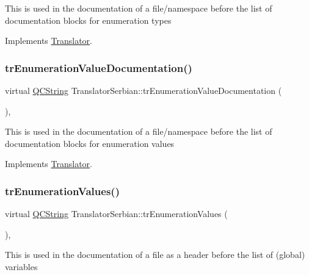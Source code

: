 This is used in the documentation of a file/namespace before the list of documentation blocks for enumeration types 

Implements \mbox{\hyperlink{class_translator}{Translator}}.

\mbox{\label{class_translator_serbian_ad10b2bac4e51aca8985c2b255fbd911f}} 
\subsubsection{\texorpdfstring{trEnumerationValueDocumentation()}{trEnumerationValueDocumentation()}}
{\footnotesize\ttfamily virtual \mbox{\hyperlink{class_q_c_string}{Q\+C\+String}} Translator\+Serbian\+::tr\+Enumeration\+Value\+Documentation (\begin{DoxyParamCaption}{ }\end{DoxyParamCaption})\hspace{0.3cm}{\ttfamily [inline]}, {\ttfamily [virtual]}}

This is used in the documentation of a file/namespace before the list of documentation blocks for enumeration values 

Implements \mbox{\hyperlink{class_translator}{Translator}}.

\mbox{\label{class_translator_serbian_a2f2df06b1746143ec0f381b9ae735c93}} 
\subsubsection{\texorpdfstring{trEnumerationValues()}{trEnumerationValues()}}
{\footnotesize\ttfamily virtual \mbox{\hyperlink{class_q_c_string}{Q\+C\+String}} Translator\+Serbian\+::tr\+Enumeration\+Values (\begin{DoxyParamCaption}{ }\end{DoxyParamCaption})\hspace{0.3cm}{\ttfamily [inline]}, {\ttfamily [virtual]}}

This is used in the documentation of a file as a header before the list of (global) variables 

